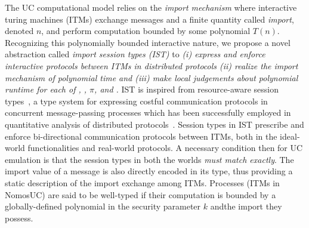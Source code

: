 The UC computational model relies on the \emph{import mechanism} where interactive turing machines (ITMs) exchange messages and a finite quantity called \emph{import}, denoted $n$, and perform computation bounded by some polynomial $T(n)$.
Recognizing this polynomially bounded interactive nature, we propose a novel abstraction called \emph{import session types (IST)} to \emph{(i) express and enforce interactive protocols between ITMs in distributed protocols (ii) realize the import mechanism of polynomial time and (iii) make local judgements about polynomial runtime for each of \A, \F, $\pi$, and \Z.} 
IST is inspired from resource-aware session types~\cite{das2018work}, a type system for expressing costful communication protocols
in concurrent message-passing processes which has been successfully employed in quantitative analysis of distributed
protocols~\cite{dasnomos,Das20FSCD,Das22LMCS,Das20arxiv}.
Session types in IST prescribe and enforce bi-directional communication protocols between ITMs, both in the ideal-world functionalities and real-world protocols.
A necessary condition then for UC emulation is that the session types in both the worlds \emph{must match exactly}.
The import value of a message is also directly encoded in its type, thus providing a static description of the import exchange
among ITMs.
Processes (ITMs in NomosUC) are said to be well-typed if their computation is bounded by a globally-defined polynomial in the security parameter $k$ andthe import they possess.


